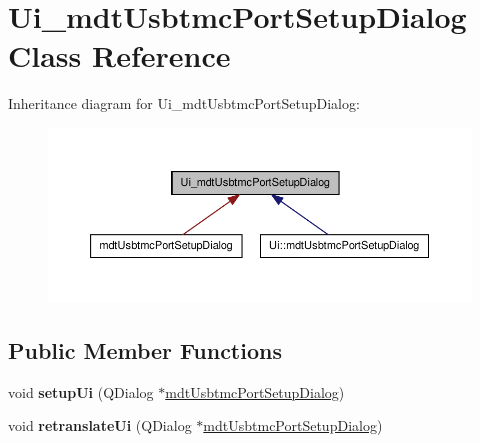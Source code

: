 \hypertarget{class_ui__mdt_usbtmc_port_setup_dialog}{
\section{Ui\_\-mdtUsbtmcPortSetupDialog Class Reference}
\label{class_ui__mdt_usbtmc_port_setup_dialog}
}


Inheritance diagram for Ui\_\-mdtUsbtmcPortSetupDialog:\nopagebreak
\begin{figure}[H]
\begin{center}
\leavevmode
\includegraphics[width=390pt]{class_ui__mdt_usbtmc_port_setup_dialog__inherit__graph}
\end{center}
\end{figure}
\subsection*{Public Member Functions}
\begin{DoxyCompactItemize}
\item 
\hypertarget{class_ui__mdt_usbtmc_port_setup_dialog_aa61ed93896240e1c04bac11c92f80382}{
void {\bfseries setupUi} (QDialog $\ast$\hyperlink{classmdt_usbtmc_port_setup_dialog}{mdtUsbtmcPortSetupDialog})}
\label{class_ui__mdt_usbtmc_port_setup_dialog_aa61ed93896240e1c04bac11c92f80382}

\item 
\hypertarget{class_ui__mdt_usbtmc_port_setup_dialog_a93532a398b7f50171b5f162e3dd954fb}{
void {\bfseries retranslateUi} (QDialog $\ast$\hyperlink{classmdt_usbtmc_port_setup_dialog}{mdtUsbtmcPortSetupDialog})}
\label{class_ui__mdt_usbtmc_port_setup_dialog_a93532a398b7f50171b5f162e3dd954fb}

\end{DoxyCompactItemize}
